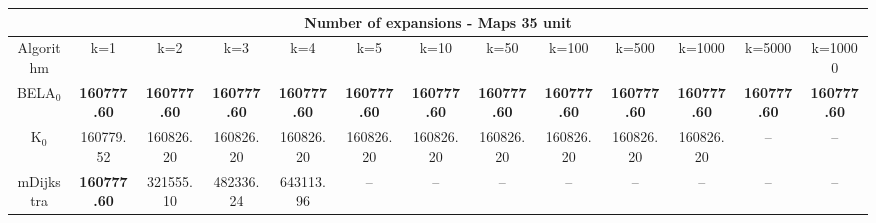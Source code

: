 \begin{tabular}{c|cccccccccccc}\toprule
\multicolumn{13}{c}{Number of expansions - Maps 35 unit}\\ \midrule
Algorithm & k=1 & k=2 & k=3 & k=4 & k=5 & k=10 & k=50 & k=100 & k=500 & k=1000 & k=5000 & k=10000 \\ \midrule
BELA$_0$ & \textbf{160777.60} & \textbf{160777.60} & \textbf{160777.60} & \textbf{160777.60} & \textbf{160777.60} & \textbf{160777.60} & \textbf{160777.60} & \textbf{160777.60} & \textbf{160777.60} & \textbf{160777.60} & \textbf{160777.60} & \textbf{160777.60} \\
K$_0$ & 160779.52 & 160826.20 & 160826.20 & 160826.20 & 160826.20 & 160826.20 & 160826.20 & 160826.20 & 160826.20 & 160826.20 & -- & -- \\
mDijkstra & \textbf{160777.60} & 321555.10 & 482336.24 & 643113.96 & -- & -- & -- & -- & -- & -- & -- & -- \\ \bottomrule 
\end{tabular}
